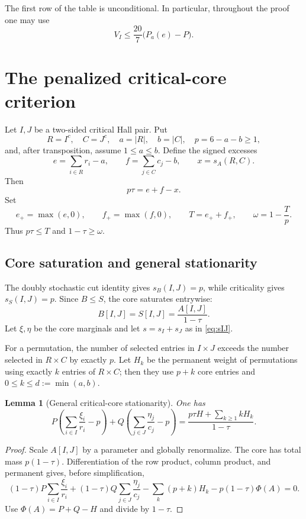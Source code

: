 \documentclass[11pt]{article}
\newtheorem{lemma}[theorem]{Lemma}
\theoremstyle{definition}
\begin{document}
The first row of the table is unconditional.  In particular, throughout the
proof one may use
\[
 V_I\le\frac{20}{7}\bigl(P_a(e)-P\bigr).
 \tag{3.9}\label{eq:global-conditional-energy}
\]

\section{The penalized critical-core criterion}

Let $I,J$ be a two-sided critical Hall pair.  Put
\[
 R=I^c,
 \quad C=J^c,
 \quad a=|R|,
 \quad b=|C|,
 \quad p=6-a-b\ge1,
\]
and, after transposition, assume $1\le a\le b$.  Define the signed excesses
\[
 e=\sum_{i\in R}r_i-a,
 \qquad
 f=\sum_{j\in C}c_j-b,
 \qquad
 x=s_A(R,C).
 \tag{4.1}\label{eq:efx}
\]
Then
\[
 p\tau=e+f-x.
 \tag{4.2}\label{eq:tau-signed}
\]
Set
\[
 e_+=\max(e,0),
 \qquad f_+=\max(f,0),
 \qquad T=e_++f_+,
 \qquad \omega=1-\frac Tp.
 \tag{4.3}\label{eq:Tomega}
\]
Thus $p\tau\le T$ and $1-\tau\ge\omega$.

\subsection{Core saturation and general stationarity}

The doubly stochastic cut identity gives $s_B(I,J)=p$, while criticality gives
$s_S(I,J)=p$.  Since $B\le S$, the core saturates entrywise:
\[
 B[I,J]=S[I,J]=\frac{A[I,J]}{1-\tau}.
 \tag{4.4}\label{eq:core-saturation-general}
\]
Let $\xi,\eta$ be the core marginals and let $s=s_I+s_J$ as in
\eqref{eq:sIJ}.

For a permutation, the number of selected entries in $I\times J$ exceeds the
number selected in $R\times C$ by exactly $p$.  Let $H_k$ be the permanent
weight of permutations using exactly $k$ entries of $R\times C$; then they use
$p+k$ core entries and $0\le k\le d:=\min(a,b)$.

\begin{lemma}[General critical-core stationarity]\label{lem:general-core-stationarity}
One has
\[
 P\left(\sum_{i\in I}\frac{\xi_i}{r_i}-p\right)
 +Q\left(\sum_{j\in J}\frac{\eta_j}{c_j}-p\right)
 =\frac{p\tau H+\sum_{k\ge1}kH_k}{1-\tau}.
 \tag{4.5}\label{eq:general-stationarity}
\]
\end{lemma}

\begin{proof}
Scale $A[I,J]$ by a parameter and globally renormalize.  The core has total
mass $p(1-\tau)$.  Differentiation of the row product, column product, and
permanent gives, before simplification,
\[
 (1-\tau)P\sum_{i\in I}\frac{\xi_i}{r_i}
 +(1-\tau)Q\sum_{j\in J}\frac{\eta_j}{c_j}
 -\sum_k(p+k)H_k-p(1-\tau)\Phi(A)=0.
\]
Use $\Phi(A)=P+Q-H$ and divide by $1-\tau$.
\end{proof}
\end{document}
